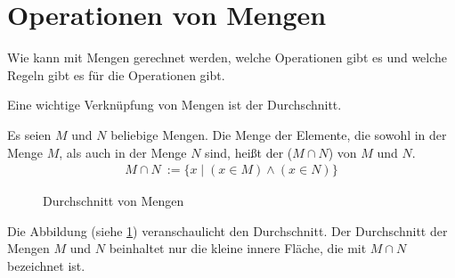 \section{Operationen von Mengen}
\label{sec:Mengen:Operationen von Mengen}

Wie kann mit Mengen gerechnet werden, welche Operationen gibt es und welche 
Regeln gibt es für die Operationen gibt.


\begin{Unit}
Eine wichtige Verknüpfung von Mengen ist der Durchschnitt.

\begin{Definition}
  Es seien $M$ und $N$ beliebige Mengen. 
  Die Menge der Elemente, die sowohl in der Menge $M$, als auch in der Menge 
  $N$ sind, heißt der  ($M \cap N$) von $M$ und $N$.
  \begin{align}
    M \cap N\ := \{ x \mid (x\in M) \land (x \in N) \}
  \end{align}
\end{Definition}

\begin{figure}[htbp]
\begin{center}
  \caption{Durchschnitt von Mengen}
  \label{Abb:Mng:Durchschnitt von Mengen}
\end{center}
\end{figure}

Die Abbildung (siehe \ref{Abb:Mng:Durchschnitt von Mengen}) veranschaulicht 
den Durchschnitt. Der Durchschnitt der Mengen $M$ und $N$ beinhaltet nur die 
kleine innere Fläche, die mit $M \cap N$ bezeichnet ist. 
\end{Unit}

